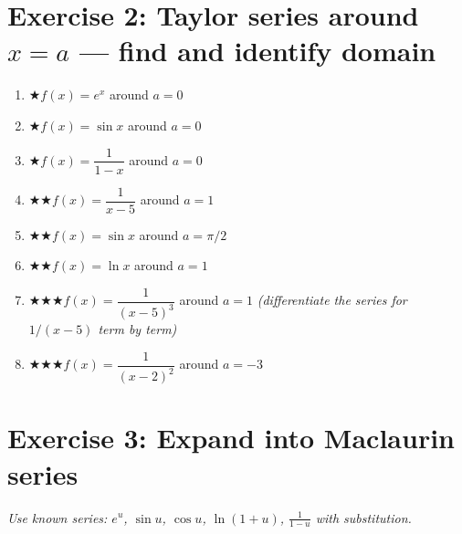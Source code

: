 \documentclass[12pt,a4paper]{article}
\newcommand{\easy}{{\color{green!60!black}$\bigstar$}}
\newcommand{\medium}{{\color{orange}$\bigstar\bigstar$}}
\newcommand{\hard}{{\color{red}$\bigstar\bigstar\bigstar$}}
\begin{document}
\section*{Exercise 2: Taylor series around $x=a$ --- find and identify domain}

\begin{enumerate}[leftmargin=*, label=(\alph*)]

\item \easy\quad $f(x)=e^x$ around $a=0$

\item \easy\quad $f(x)=\sin x$ around $a=0$

\item \easy\quad $f(x)=\dfrac{1}{1-x}$ around $a=0$

\item \medium\quad $f(x)=\dfrac{1}{x-5}$ around $a=1$

\item \medium\quad $f(x)=\sin x$ around $a=\pi/2$

\item \medium\quad $f(x)=\ln x$ around $a=1$

\item \hard\quad $f(x)=\dfrac{1}{(x-5)^3}$ around $a=1$
\quad\emph{(differentiate the series for $1/(x-5)$ term by term)}

\item \hard\quad $f(x)=\dfrac{1}{(x-2)^2}$ around $a=-3$

\end{enumerate}

\section*{Exercise 3: Expand into Maclaurin series}

\emph{Use known series: $e^u$, $\sin u$, $\cos u$, $\ln(1+u)$, $\frac{1}{1-u}$
with substitution.}
\end{document}
